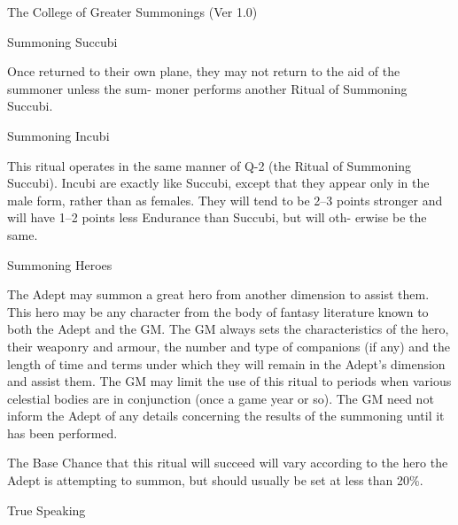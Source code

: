 \begin{Chapter}{The College of Greater Summonings (Ver 1.0)}
\begin{ritual}[Q-2]{Summoning Succubi }
\begin{effects}
Once  returned  to  their  own  plane,  they  may  not 
return to  the  aid  of the  summoner  unless the  sum-
moner  performs  another  Ritual  of  Summoning 
Succubi. 

\end{effects}
\end{ritual}

\begin{ritual}[Q-3]{Summoning Incubi }

\begin{effects}
This ritual operates in the same manner of 
Q-2 (the Ritual of Summoning Succubi). Incubi are 
exactly  like  Succubi,  except  that  they  appear  only 
in the male form, rather than as females. They will 
tend  to  be  2–3  points  stronger  and  will  have  1–2 
points  less  Endurance  than  Succubi,  but  will  oth-
erwise be the same. 

\end{effects}
\end{ritual}

\begin{ritual}[Q-4]{Summoning Heroes }

\begin{effects}
The Adept may summon a great hero from 
another dimension to assist them. This hero may be 
any  character  from  the  body  of  fantasy  literature 
known  to  both  the  Adept  and  the  GM.  The  GM 
always  sets  the  characteristics  of  the  hero,  their 
weaponry  and  armour,  the  number  and  type  of 
companions  (if  any)  and  the  length  of  time  and 
terms under which they will remain in the Adept’s 
dimension and assist them. The GM  may limit the 
use  of  this  ritual  to  periods  when  various  celestial 
bodies are in conjunction (once a game year or so). 
The  GM  need  not inform the  Adept of  any  details 
concerning  the  results  of  the  summoning  until  it 
has been performed. 

The  Base  Chance  that  this  ritual  will  succeed  will 
vary according to the hero the Adept is attempting 
to  summon,  but  should  usually  be  set  at  less  than 
20\%. 

\end{effects}
\end{ritual}

\begin{ritual}[Q-5]{True Speaking }


\end{ritual}
\end{Chapter}
